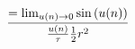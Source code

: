 \documentclass[preview]{standalone}
\begin{document}
\begin{align*}
= \lim_{u(n) \to 0} \sin \left( u(n)\right) \over {\frac {u(n)}{\tau} }\frac {1} {2} r^2
\end{align*}
\end{document}
